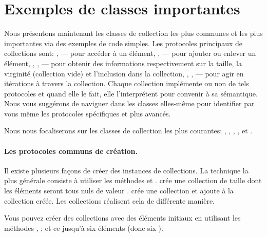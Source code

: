 \documentclass[a4paper,10pt,twoside]{book}
\begin{document}
\section{Exemples de classes importantes}
Nous pr\'esentons maintenant les classes de collection les plus communes et les plus importantes via des exemples de code simples.
Les protocoles principaux de collections sont: ,  --- pour acc\'eder \`a un \'el\'ement, ,  --- pour ajouter ou enlever un \'el\'ement, , ,  --- pour obtenir des informations respectivement sur la taille, la virginit\'e (collection vide) et l'inclusion dans la collection, , ,  --- pour agir en it\'erations \`a travers la collection.
Chaque collection impl\'emente ou non de tels protocoles et quand elle 
le fait, elle l'interpr\'etent pour convenir \`a sa s\'emantique.
Nous vous sugg\'erons de naviguer dans les classes elles-m\^eme pour
identifier par vous m\^eme les protocoles sp\'ecifiques et plus
avanc\'es.

Nous nous focaliserons sur les classes de collection les plus courantes:
, , , ,  et .

\paragraph{Les protocoles communs de cr\'eation.}
Il existe plusieurs fa\c{c}ons de cr\'eer des instances de collections.
La technique la plus g\'en\'erale consiste \`a utiliser les m\'ethodes
 et .
 cr\'ee une collection de taille  
dont les \'el\'ements seront tous nuls \cad de valeur . 
  cr\'ee une collection
et ajoute  \`a la collection cr\'e\'ee. 
Les collections r\'ealisent cela de diff\'erente mani\`ere.

Vous pouvez cr\'eer des collections avec des \'el\'ements initiaux
en utilisant les m\'ethodes \mbox{,}
 \etc; et ce jusqu'\`a 
six \'el\'ements (donc six ).
\end{document}
